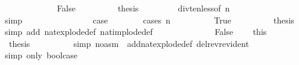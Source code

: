 \begin{isabellebody}
\ \ \ \ \isamarkupfalse%
\isanewline
\ \ \ \ \ \ \isamarkupfalse%
\ False\isanewline
\ \ \ \ \ \ \isamarkupfalse%
\ \isamarkupfalse%
\ {\isacharquery}{\kern0pt}thesis\ \isanewline
\ \ \ \ \ \ \isamarkupfalse%
\ div{\isacharunderscore}{\kern0pt}ten{\isacharunderscore}{\kern0pt}less{\isacharbrackleft}{\kern0pt}of\ {\isacartoucheopen}n{\isacartoucheclose}{\isacharbrackright}{\kern0pt}\ {\isacharasterisk}{\kern0pt}\ \isanewline
\ \ \ \ \ \ \isamarkupfalse%
{\isacharparenleft}{\kern0pt}simp{\isacharparenright}{\kern0pt}\ \ \ \ \ \ \isanewline
\ \ \isamarkupfalse%
\isanewline
\ \ \ \ \isamarkupfalse%
\ \isamarkupfalse%
\ {\isacharquery}{\kern0pt}case\ \ \isanewline
\ \ \ \ \isamarkupfalse%
\ {\isacharparenleft}{\kern0pt}cases\ {\isacartoucheopen}n\ {\isacharless}{\kern0pt}\ {}{}{\isacartoucheclose}{\isacharparenright}{\kern0pt}\isanewline
\ \ \ \ \ \ \isamarkupfalse%
\ True\isanewline
\ \ \ \ \ \ \isamarkupfalse%
\ \isamarkupfalse%
\ {\isacharquery}{\kern0pt}thesis\ \ \isamarkupfalse%
{\isacharparenleft}{\kern0pt}simp\ add{\isacharcolon}{\kern0pt}\ nat{\isacharunderscore}{\kern0pt}explode{\isacharunderscore}{\kern0pt}def\ nat{\isacharunderscore}{\kern0pt}implode{\isacharunderscore}{\kern0pt}def{\isacharparenright}{\kern0pt}\isanewline
\ \ \ \ \isamarkupfalse%
\ \isanewline
\ \ \ \ \ \ \isamarkupfalse%
\ False\ \isamarkupfalse%
\ {\isacharasterisk}{\kern0pt}{\isacharasterisk}{\kern0pt}{\isacharasterisk}{\kern0pt}\ {\isacharequal}{\kern0pt}\ this\isanewline
\ \ \ \ \ \ \isamarkupfalse%
\ \isamarkupfalse%
\ {\isacharquery}{\kern0pt}thesis\ \isanewline
\ \ \ \ \ \ \ \ \isamarkupfalse%
{\isacharparenleft}{\kern0pt}simp\ {\isacharparenleft}{\kern0pt}no{\isacharunderscore}{\kern0pt}asm{\isacharparenright}{\kern0pt}\ \ add{\isacharcolon}{\kern0pt}nat{\isacharunderscore}{\kern0pt}explode{\isacharunderscore}{\kern0pt}def\ del{\isacharcolon}{\kern0pt}rev{\isacharunderscore}{\kern0pt}rev{\isacharunderscore}{\kern0pt}ident{\isacharparenright}{\kern0pt}\isanewline
\ \ \ \ \ \ \ \ \isamarkupfalse%
{\isacharparenleft}{\kern0pt}simp\ only{\isacharcolon}{\kern0pt}\ bool{\isachardot}{\kern0pt}case{\isacharparenleft}{\kern0pt}{}{\isacharparenright}{\kern0pt}{\isacharparenright}{\kern0pt}\isanewline

\end{isabellebody}
